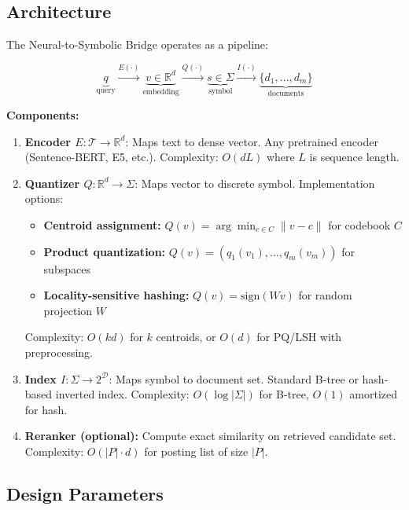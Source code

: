 \documentclass[manuscript,screen,nonacm]{acmart}
\begin{document}
\subsection{Architecture}

The Neural-to-Symbolic Bridge operates as a pipeline:

\[
\underbrace{q}_{\text{query}} \xrightarrow{E(\cdot)} \underbrace{v \in \mathbb{R}^d}_{\text{embedding}} \xrightarrow{Q(\cdot)} \underbrace{s \in \Sigma}_{\text{symbol}} \xrightarrow{I(\cdot)} \underbrace{\{d_1, \ldots, d_m\}}_{\text{documents}}
\]

\textbf{Components:}
\begin{enumerate}
    \item \textbf{Encoder $E: \mathcal{T} \rightarrow \mathbb{R}^d$}: Maps text to dense vector. Any pretrained encoder (Sentence-BERT, E5, etc.). Complexity: $O(dL)$ where $L$ is sequence length.

    \item \textbf{Quantizer $Q: \mathbb{R}^d \rightarrow \Sigma$}: Maps vector to discrete symbol. Implementation options:
    \begin{itemize}
        \item \textbf{Centroid assignment:} $Q(v) = \arg\min_{c \in C} \|v - c\|$ for codebook $C$
        \item \textbf{Product quantization:} $Q(v) = (q_1(v_1), \ldots, q_m(v_m))$ for subspaces
        \item \textbf{Locality-sensitive hashing:} $Q(v) = \text{sign}(Wv)$ for random projection $W$
    \end{itemize}
    Complexity: $O(kd)$ for $k$ centroids, or $O(d)$ for PQ/LSH with preprocessing.

    \item \textbf{Index $I: \Sigma \rightarrow 2^{\mathcal{D}}$}: Maps symbol to document set. Standard B-tree or hash-based inverted index. Complexity: $O(\log |\Sigma|)$ for B-tree, $O(1)$ amortized for hash.

    \item \textbf{Reranker (optional):} Compute exact similarity on retrieved candidate set. Complexity: $O(|P| \cdot d)$ for posting list of size $|P|$.
\end{enumerate}

\subsection{Design Parameters}
\end{document}
